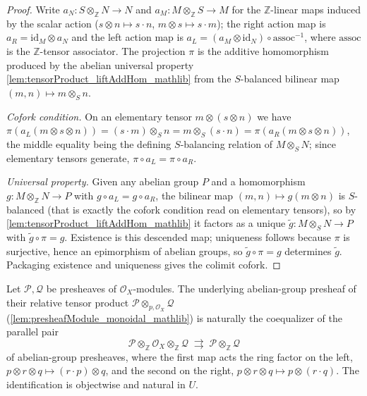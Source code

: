 \begin{proof}  Write \(a_N : S \otimes_{\mathbb{Z}} N \to N\) and
  \(a_M : M \otimes_{\mathbb{Z}} S \to M\) for the \(\mathbb{Z}\)-linear maps
  induced by the scalar action (\(s \otimes n \mapsto s \cdot n\),
  \(m \otimes s \mapsto s \cdot m\)); the right action map is
  \(a_R = \mathrm{id}_M \otimes a_N\) and the left action map is
  \(a_L = (a_M \otimes \mathrm{id}_N) \circ \mathrm{assoc}^{-1}\), where
  \(\mathrm{assoc}\) is the \(\mathbb{Z}\)-tensor associator. The projection
  \(\pi\) is the additive homomorphism produced by the abelian universal property
  \cref{lem:tensorProduct_liftAddHom_mathlib} from the \(S\)-balanced bilinear map
  \((m, n) \mapsto m \otimes_S n\).

  \emph{Cofork condition.} On an elementary tensor
  \(m \otimes (s \otimes n)\) we have
  \(\pi(a_L(m \otimes s \otimes n)) = (s \cdot m) \otimes_S n
  = m \otimes_S (s \cdot n) = \pi(a_R(m \otimes s \otimes n))\), the middle
  equality being the defining \(S\)-balancing relation of \(M \otimes_S N\); since
  elementary tensors generate, \(\pi \circ a_L = \pi \circ a_R\).

  \emph{Universal property.} Given any abelian group \(P\) and a homomorphism
  \(g : M \otimes_{\mathbb{Z}} N \to P\) with \(g \circ a_L = g \circ a_R\), the
  bilinear map \((m, n) \mapsto g(m \otimes n)\) is \(S\)-balanced (that is exactly
  the cofork condition read on elementary tensors), so by
  \cref{lem:tensorProduct_liftAddHom_mathlib} it factors as a unique
  \(\widetilde{g} : M \otimes_S N \to P\) with \(\widetilde{g} \circ \pi = g\).
  Existence is this descended map; uniqueness follows because \(\pi\) is
  surjective, hence an epimorphism of abelian groups, so \(\widetilde{g} \circ \pi
  = g\) determines \(\widetilde{g}\). Packaging existence and uniqueness gives the
  colimit cofork.

\end{proof}

\begin{lemma}
  \label{lem:relativeTensor_as_coequalizer}
  Let \(\mathcal{P}, \mathcal{Q}\) be presheaves of \(\mathcal{O}_X\)-modules. The
  underlying abelian-group presheaf of their relative tensor product
  \(\mathcal{P} \otimes_{p,\mathcal{O}_X} \mathcal{Q}\)
  (\cref{lem:presheafModule_monoidal_mathlib}) is naturally the coequalizer of the
  parallel pair
  \[
    \mathcal{P} \otimes_{\mathbb{Z}} \mathcal{O}_X \otimes_{\mathbb{Z}} \mathcal{Q}
    \;\rightrightarrows\;
    \mathcal{P} \otimes_{\mathbb{Z}} \mathcal{Q}
  \]
  of abelian-group presheaves, where the first map acts the ring factor on the left,
  \(p \otimes r \otimes q \mapsto (r \cdot p) \otimes q\), and the second on the
  right, \(p \otimes r \otimes q \mapsto p \otimes (r \cdot q)\). The identification
  is objectwise and natural in \(U\).
\end{lemma}

